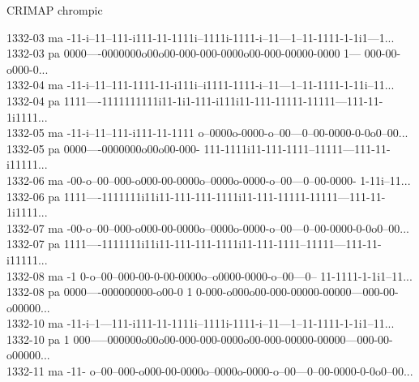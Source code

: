 \documentclass[aspectratio=169,12pt,t]{beamer}
\begin{document}
\begin{frame}[c]{CRIMAP chrompic}

\begin{center}

{\fontsize{6.9pt}{7.6}\selectfont \tt

1332-03 ma {\color{purple} -11-i--11--111-i111-11-1111i--1111i-1111-i--11---1--11-1111-1-1i1---1}... \\
1332-03 pa {\color{green} 0000----0000000o00o00-000-000-0000o00-000-00000-0000}{\color{purple} 1}---{\color{green} 000-00-o000-0}... \\[6pt]
1332-04 ma {\color{purple} -11-i--11--111-1111-11-i111i--i1111-1111-i--11---1--11-1111-1-11i--11}... \\
1332-04 pa {\color{purple} 1111----1111111111i11-1i1-111-i111i11-111-11111-11111---111-11-1i1111}... \\[6pt]
1332-05 ma {\color{purple} -11-i--11--111-i111-11-1111}{\color{green} o--0000o-0000-o--00---0--00-0000-0-0o0--00}... \\
1332-05 pa {\color{green} 0000----0000000o00o00-000}-{\color{purple} 111-1111i11-111-1111--11111---111-11-i11111}... \\[6pt]
1332-06 ma {\color{green} -00-o--00--000-o000-00-0000o--0000o-0000-o--00---0--00-0000}-{\color{purple} 1-11i--11}... \\
1332-06 pa {\color{purple} 1111----1111111i11i11-111-111-1111i11-111-11111-11111---111-11-1i1111}... \\[6pt]
1332-07 ma {\color{green} -00-o--00--000-o000-00-0000o--0000o-0000-o--00---0--00-0000-0-0o0--00}... \\
1332-07 pa {\color{purple} 1111----1111111i11i11-111-111-1111i11-111-1111--11111---111-11-i11111}... \\[6pt]
1332-08 ma {\color{purple} -1}{\color{green} 0-o--00--000-00-0-00-0000o--o0000-0000-o--00---0}--{\color{purple} 11-1111-1-1i1--11}... \\
1332-08 pa {\color{green} 0000----000000000-o00-0}{\color{purple} 1}{\color{green} 0-000-o000o00-000-00000-00000---000-00-o00000}... \\[6pt]
1332-10 ma {\color{purple} -11-i--1---111-i111-11-1111i--1111i-1111-i--11---1--11-1111-1-1i1--11}... \\
1332-10 pa {\color{purple} 1}{\color{green} 000-----000000o00o00-000-000-0000o00-000-00000-00000---000-00-o00000}... \\[6pt]
1332-11 ma {\color{purple} -11}-{\color{green} o--00--000-o000-00-0000o--0000o-0000-o--00---0--00-0000-0-0o0--00}... \\
}
\end{center}
\end{frame}
\end{document}
